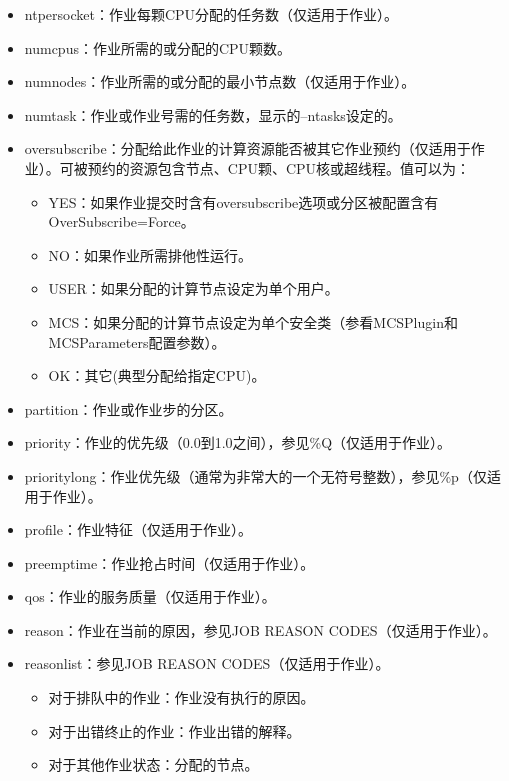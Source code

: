 \begin{itemize}
\begin{itemize}
\begin{itemize}
    \item ntpersocket：作业每颗CPU分配的任务数（仅适用于作业）。
    \item numcpus：作业所需的或分配的CPU颗数。
    \item numnodes：作业所需的或分配的最小节点数（仅适用于作业）。
    \item numtask：作业或作业号需的任务数，显示的--ntasks设定的。
    \item oversubscribe：分配给此作业的计算资源能否被其它作业预约（仅适用于作业）。可被预约的资源包含节点、CPU颗、CPU核或超线程。值可以为：
\begin{itemize}
	\item YES：如果作业提交时含有oversubscribe选项或分区被配置含有\\OverSubscribe=Force。
   	\item NO：如果作业所需排他性运行。
   	\item USER：如果分配的计算节点设定为单个用户。
   	\item MCS：如果分配的计算节点设定为单个安全类（参看MCSPlugin和\\MCSParameters配置参数）。
   	\item OK：其它(典型分配给指定CPU)。
\end{itemize}
   	\item partition：作业或作业步的分区。
   	\item priority：作业的优先级（0.0到1.0之间），参见\%Q（仅适用于作业）。
   	\item prioritylong：作业优先级（通常为非常大的一个无符号整数），参见\%p（仅适用于作业）。
   	\item profile：作业特征（仅适用于作业）。
   	\item preemptime：作业抢占时间（仅适用于作业）。
   	\item qos：作业的服务质量（仅适用于作业）。
   	\item reason：作业在当前的原因，参见JOB REASON CODES（仅适用于作业）。
   	\item reasonlist：参见JOB REASON CODES（仅适用于作业）。
   	\begin{itemize}
   	   	\item 对于排队中的作业：作业没有执行的原因。
   	   	\item 对于出错终止的作业：作业出错的解释。
   	   	\item 对于其他作业状态：分配的节点。
   	\end{itemize}

\end{itemize}
\end{itemize}
\end{itemize}
